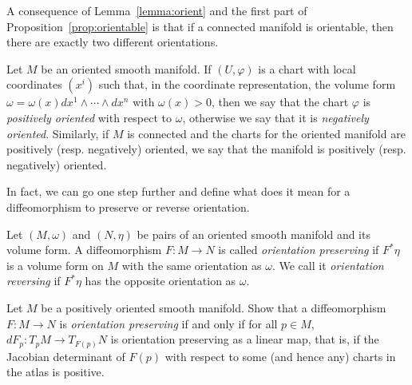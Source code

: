 A consequence of Lemma~\ref{lemma:orient} and the first part of Proposition~\ref{prop:orientable} is that if a connected manifold is orientable, then there are exactly two different orientations.

\begin{definition}
	Let $M$ be an oriented smooth manifold.
	If $(U,\varphi)$ is a chart with local coordinates $(x^i)$ such that, in the coordinate representation, the volume form $\omega = \omega(x) dx^1\wedge\cdots\wedge dx^n$ with $\omega(x) > 0$, then we say that the chart $\varphi$ is \emph{positively oriented} with respect to $\omega$, otherwise we say that it is \emph{negatively oriented}.
	Similarly, if $M$ is connected and the charts for the oriented manifold are positively (resp. negatively) oriented, we say that the manifold is positively (resp. negatively) oriented.
\end{definition}

In fact, we can go one step further and define what does it mean for a diffeomorphism to preserve or reverse orientation.

\begin{definition}
	Let $(M, \omega)$ and $(N, \eta)$ be pairs of an oriented smooth manifold and its volume form.
	A diffeomorphism $F: M \to N$ is called \emph{orientation preserving} if $F^* \eta$ is a volume form on $M$ with the same orientation as $\omega$.
	We call it \emph{orientation reversing} if $F^*\eta$ has the opposite orientation as $\omega$.
\end{definition}

\begin{exercise}
	Let $M$ be a positively oriented smooth manifold.
	Show that a diffeomorphism $F: M \to N$ is \emph{orientation preserving} if and only if for all $p\in M$, $dF_p : T_p M \to T_{F(p)} N$ is orientation preserving as a linear map, that is, if the Jacobian determinant of $F(p)$ with respect to some (and hence any) charts in the atlas is positive.
\end{exercise}

